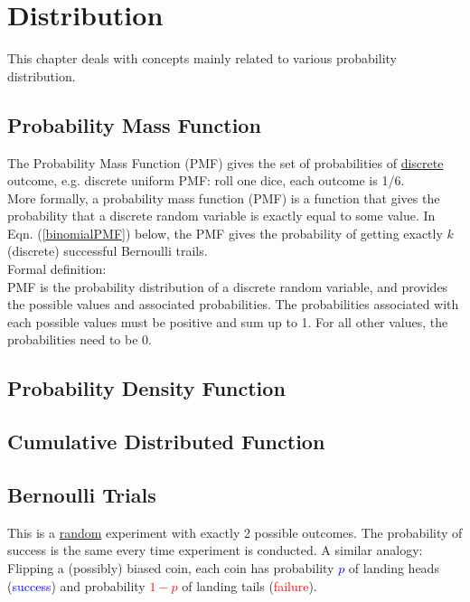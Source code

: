 \graphicspath{%
{chapter1graph/}%
{chapter1graph/bg/}}


\chapter{Distribution}

This chapter deals with concepts mainly related to various probability distribution.

\section{Probability Mass Function}

The Probability Mass Function (PMF) gives the set of probabilities of \underline{discrete} outcome, e.g. discrete uniform PMF: roll one dice, each outcome is 1/6. \\

More formally, a probability mass function (PMF) is a function that gives the probability that a discrete random variable is exactly equal to some value. In Eqn. (\ref{binomialPMF}) below, the PMF gives the probability of getting exactly $k$ (discrete) successful Bernoulli trails. \\

Formal definition:\\
PMF is the probability distribution of a discrete random variable, and provides the possible values and associated probabilities. The probabilities associated with each possible values must be positive and sum up to 1. For all other values, the probabilities need to be 0.

\section{Probability Density Function}


\section{Cumulative Distributed Function}

\section{Bernoulli Trials}

This is a \underline{random} experiment with exactly 2 possible outcomes. The probability of success is the same every time experiment is conducted. A similar analogy: Flipping a (possibly) biased coin, each coin has probability \textcolor{blue}{$p$} of landing heads (\textcolor{blue}{success}) and probability \textcolor{red}{$1 - p$} of landing tails (\textcolor{red}{failure}).  \\

